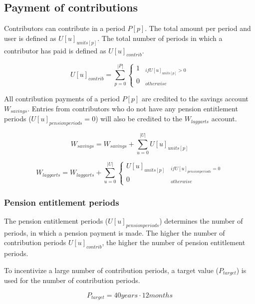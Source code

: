 \subsection{Payment of contributions}

Contributors can contribute in a period $P[p]$. The total amount per period and user is defined as $U[u]_{units[p]}$. The total number of periods in which a contributor has paid is defined as $U[u]_{contrib}$.

\begin{equation}
U[u]_{contrib} = \sum_{p=0}^{|P|} \begin{cases} 
1 & _{if U[u]_{units[p]} > 0} \\
0 & _{otherwise}
\end{cases}
\end{equation}


All contribution payments of a period $P[p]$ are credited to the savings account $W_{savings}$.
Entries from contributors who do not have any pension entitlement periods ($U[u]_{pensionperiods} = 0$) will also be credited to the $W_{laggarts}$ account.


\begin{equation}
W_{savings} = W_{savings} + \sum_{u=0}^{|U|} U[u]_{units[p]}
\end{equation}


\begin{dmath}
W_{laggarts} = W_{laggarts} + \sum_{u=0}^{|U|} \begin{cases} 
U[u]_{units[p]} & _{if U[u]_{pensionperiods} = 0} \\
0 & _{otherwise}
\end{cases}
\end{dmath}

\subsubsection{Pension entitlement periods}
The pension entitlement periods ($U[u]_{pensionperiods}$) determines the number of periods, in which a pension payment is made. The higher the number of contribution periods
$U[u]_{contrib}$, the higher the number of pension entitlement periods.

To incentivize a large number of contribution periods, a target value ($P_{target}$) is used
for the number of contribution periods. 

\begin{equation}
	P_{target} = 40 years \cdot 12 months
\end{equation}

